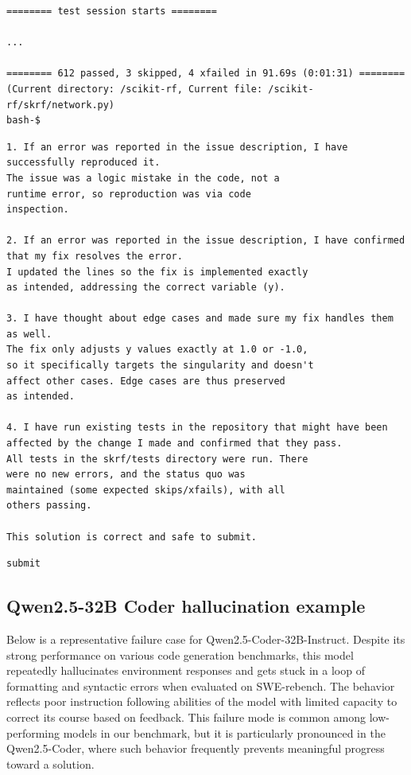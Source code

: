 \documentclass[dandb]{article}
\begin{document}
\begin{flushright}
  \begin{envmessage}
  \begin{lstlisting}[backgroundcolor=\color{green!5!white},frame=none]
======== test session starts ========

...

======== 612 passed, 3 skipped, 4 xfailed in 91.69s (0:01:31) ========
(Current directory: /scikit-rf, Current file: /scikit-rf/skrf/network.py)
bash-$
  \end{lstlisting}
  \end{envmessage}
\end{flushright}

\begin{agentmessage}
\begin{lstlisting}[backgroundcolor=\color{blue!5!white},frame=none]
1. If an error was reported in the issue description, I have successfully reproduced it.
The issue was a logic mistake in the code, not a
runtime error, so reproduction was via code
inspection.

2. If an error was reported in the issue description, I have confirmed that my fix resolves the error.
I updated the lines so the fix is implemented exactly
as intended, addressing the correct variable (y).

3. I have thought about edge cases and made sure my fix handles them as well.
The fix only adjusts y values exactly at 1.0 or -1.0,
so it specifically targets the singularity and doesn't 
affect other cases. Edge cases are thus preserved
as intended.

4. I have run existing tests in the repository that might have been affected by the change I made and confirmed that they pass.
All tests in the skrf/tests directory were run. There
were no new errors, and the status quo was 
maintained (some expected skips/xfails), with all
others passing.

This solution is correct and safe to submit.
\end{lstlisting}

\begin{lstlisting}[backgroundcolor=\color{white!10}]
submit
\end{lstlisting}
\end{agentmessage}


\subsection{Qwen2.5-32B Coder hallucination example} 
Below is a representative failure case for Qwen2.5-Coder-32B-Instruct. Despite its strong performance on various code generation benchmarks, this model repeatedly hallucinates environment responses and gets stuck in a loop of formatting and syntactic errors when evaluated on SWE-rebench. The behavior reflects poor instruction following abilities of the model with limited capacity to correct its course based on feedback. This failure mode is common among low-performing models in our benchmark, but it is particularly pronounced in the Qwen2.5-Coder, where such behavior frequently prevents meaningful progress toward a solution.
\end{document}

